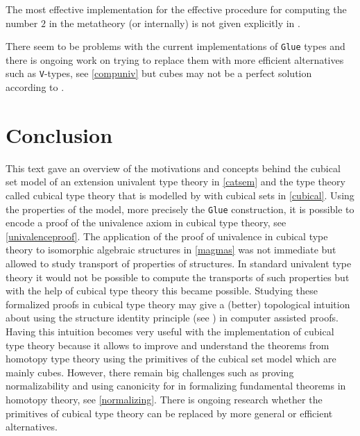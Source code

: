 \documentclass[12pt,a4paper,twoside,xetex]{book}
\begin{document}
The most effective implementation for the effective procedure for computing the 
number $2$ in the metatheory (or internally) is 
not given explicitly in \cite{Coquand2019}.


 There seem to be problems with 
the current implementations of \texttt{Glue} types and there is ongoing work on 
trying to replace them with more efficient alternatives such as 
\texttt{V}-types, see \cref{compuniv} but cubes may not be a perfect solution 
according to \cite{Cubicalv92:online}.

% 






\chapter*{Conclusion}

This text gave an overview of the motivations and concepts behind the cubical 
set model of an extension univalent type theory in \cref{catsem} and the type 
theory called cubical type theory that is modelled by with cubical sets in 
\cref{cubical}. Using the properties of the model, more precisely the 
\texttt{Glue} construction, it is possible to encode a proof of the univalence 
axiom in cubical type theory, see \cref{univalenceproof}. The application of the 
proof of univalence in cubical type theory to isomorphic algebraic structures in 
\cref{magmas} was not immediate but allowed to study transport of properties of 
structures. In standard univalent type theory it would not be possible to 
compute the transports of such properties but with the help of cubical type 
theory this became possible. Studying these formalized proofs in cubical type 
theory may give a (better) topological intuition about using the structure 
identity principle (see \cite{Aczel2012}) in computer assisted proofs. Having 
this intuition becomes very useful with the implementation of cubical type 
theory because it allows to improve and understand the theorems from homotopy 
type theory using the primitives of the cubical set model which are mainly 
cubes. However, there remain big challenges such as proving normalizability and 
using canonicity for in formalizing fundamental theorems in homotopy theory, see 
\cref{normalizing}. There is ongoing research whether the primitives of cubical 
type theory can be replaced by more general or efficient alternatives.
\end{document}
